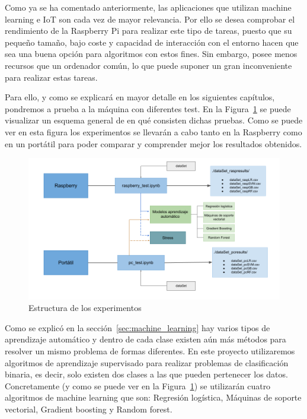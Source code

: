 \documentclass[a4paper, 12pt]{book}
\begin{document}
Como ya se ha comentado anteriormente, las aplicaciones que utilizan machine learning e IoT son cada vez de mayor relevancia. Por ello se desea comprobar el rendimiento de la Raspberry Pi para realizar este tipo de tareas, puesto que su pequeño tamaño, bajo coste y capacidad de interacción con el entorno hacen que sea una buena opción para algoritmos con estos fines. Sin embargo, posee menos recursos que un ordenador común, lo que puede suponer un gran inconveniente para realizar estas tareas. 

Para ello, y como se explicará en mayor detalle en los siguientes capítulos, pondremos a prueba a la máquina con diferentes test. En la Figura~\ref{fig:arquitectura} se puede visualizar un esquema general de en qué consisten dichas pruebas. Como se puede ver en esta figura los experimentos se llevarán a cabo tanto en la Raspberry como en un portátil para poder comparar y comprender mejor los resultados obtenidos.


\begin{figure}[]
  \centering
  \includegraphics[width=15cm, keepaspectratio]{img/arquitectura_general.png}
  \caption{Estructura de los experimentos}\label{fig:arquitectura}
\end{figure}

Como se explicó en la sección~\ref{sec:machine_learning} hay varios tipos de aprendizaje automático y dentro de cada clase existen aún más métodos para resolver un mismo problema de formas diferentes. En este proyecto utilizaremos algoritmos de aprendizaje supervisado para realizar problemas de clasificación binaria, es decir, solo existen dos clases a las que pueden pertenecer los datos. Concretamente (y como se puede ver en la Figura~\ref{fig:arquitectura}) se utilizarán cuatro algoritmos de machine learning que son: Regresión logística, Máquinas de soporte vectorial, Gradient boosting y Random forest.
\end{document}
